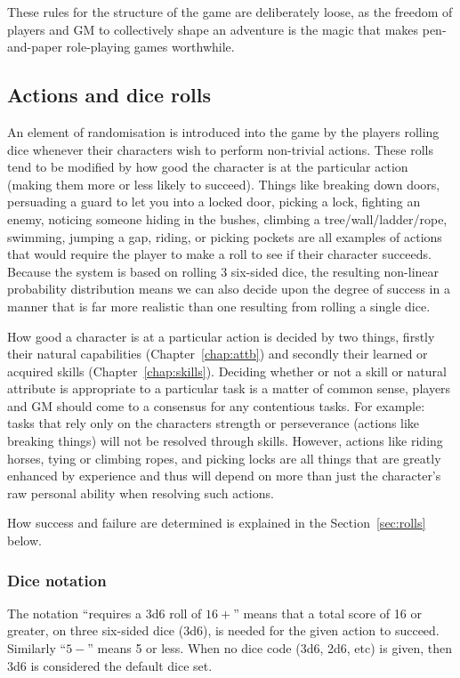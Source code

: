 \documentclass[a4paper,10pt,oneside]{book}
\begin{document}
These rules for the structure of the game are deliberately loose, as the freedom of players and GM to collectively shape an adventure is the magic that makes pen-and-paper role-playing games worthwhile.

\subsection{Actions and dice rolls}
An element of randomisation is introduced into the game by the players rolling dice whenever their characters wish to perform non-trivial actions. These rolls tend to be modified by how good the character is at the particular action (making them more or less likely to succeed). Things like breaking down doors, persuading a guard to let you into a locked door, picking a lock, fighting an enemy, noticing someone hiding in the bushes, climbing a tree/wall/ladder/rope, swimming, jumping a gap, riding, or picking pockets are all examples of actions that would require the player to make a roll to see if their character succeeds. Because the system is based on rolling 3 six-sided dice, the resulting non-linear probability distribution means we can also decide upon the degree of success in a manner that is far more realistic than one resulting from rolling a single dice. 

How good a character is at a particular action is decided by two things, firstly their natural capabilities (Chapter~\ref{chap:attb}) and secondly their learned or acquired skills (Chapter~\ref{chap:skills}). Deciding whether or not a skill or natural attribute is appropriate to a particular task is a matter of common sense, players and GM should come to a consensus for any contentious tasks. For example: tasks that rely only on the characters strength or perseverance (actions like breaking things) will not be resolved through skills. However, actions like riding horses, tying or climbing ropes, and picking locks are all things that are greatly enhanced by experience and thus will depend on more than just the character's raw personal ability when resolving such actions.  

How success and failure are determined is explained in the Section~\ref{sec:rolls} below.

\subsubsection{Dice notation}
The notation ``requires a 3d6 roll of $16+$'' means that a total score of 16 or greater, on three six-sided dice (3d6), is needed for the given action to succeed. Similarly ``$5-$'' means 5 or less. When no dice code (3d6, 2d6, etc) is given, then 3d6 is considered the default dice set.
\end{document}
